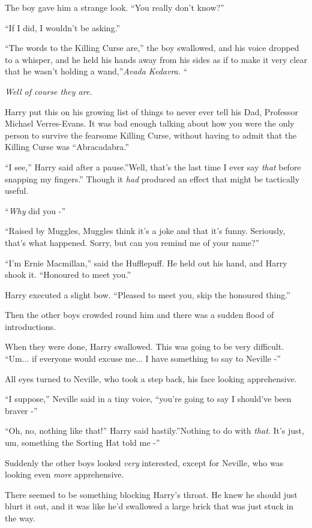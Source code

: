 The boy gave him a strange look. ``You really don't know?''

``If I did, I wouldn't be asking.''

``The words to the Killing Curse are,'' the boy swallowed, and his voice
dropped to a whisper, and he held his hands away from his sides as if to
make it very clear that he wasn't holding a wand,''\emph{Avada Kedavra.}
``

\emph{Well of course they are.}

Harry put this on his growing list of things to never ever tell his Dad,
Professor Michael Verres-Evans. It was bad enough talking about how you
were the only person to survive the fearsome Killing Curse, without
having to admit that the Killing Curse was ``Abracadabra.''

``I see,'' Harry said after a pause.''Well, that's the last time I ever
say \emph{that} before snapping my fingers.'' Though it \emph{had}
produced an effect that might be tactically useful.

``\emph{Why} did you -''

``Raised by Muggles, Muggles think it's a joke and that it's funny.
Seriously, that's what happened. Sorry, but can you remind me of your
name?''

``I'm Ernie Macmillan,'' said the Hufflepuff. He held out his hand, and
Harry shook it. ``Honoured to meet you.''

Harry executed a slight bow. ``Pleased to meet you, skip the honoured
thing.''

Then the other boys crowded round him and there was a sudden flood of
introductions.

When they were done, Harry swallowed. This was going to be very
difficult. ``Um... if everyone would excuse me... I have
something to say to Neville -''

All eyes turned to Neville, who took a step back, his face looking
apprehensive.

``I suppose,'' Neville said in a tiny voice, ``you're going to say I
should've been braver -''

``Oh, no, nothing like that!'' Harry said hastily.''Nothing to do with
\emph{that}. It's just, um, something the Sorting Hat told me -''

Suddenly the other boys looked \emph{very} interested, except for
Neville, who was looking even \emph{more} apprehensive.

There seemed to be something blocking Harry's throat. He knew he should
just blurt it out, and it was like he'd swallowed a large brick that was
just stuck in the way.

